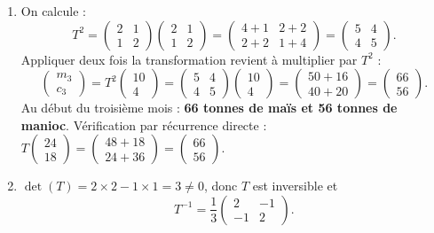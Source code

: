 \documentclass[11pt]{article}
\begin{document}
\begin{corrige}
\begin{enumerate}
\item On calcule :
\[ T^2=\begin{pmatrix} 2 & 1 \\ 1 & 2 \end{pmatrix}\begin{pmatrix} 2 & 1 \\ 1 & 2 \end{pmatrix}=\begin{pmatrix} 4+1 & 2+2 \\ 2+2 & 1+4 \end{pmatrix}=\begin{pmatrix} 5 & 4 \\ 4 & 5 \end{pmatrix}. \]
Appliquer deux fois la transformation revient à multiplier par $T^2$ :
\[ \begin{pmatrix} m_3 \\ c_3 \end{pmatrix}=T^2\begin{pmatrix} 10 \\ 4 \end{pmatrix}=\begin{pmatrix} 5 & 4 \\ 4 & 5 \end{pmatrix}\begin{pmatrix} 10 \\ 4 \end{pmatrix}=\begin{pmatrix} 50+16 \\ 40+20 \end{pmatrix}=\begin{pmatrix} 66 \\ 56 \end{pmatrix}. \]
Au début du troisième mois : \textbf{66 tonnes de maïs et 56 tonnes de manioc}. Vérification par récurrence directe : $T\begin{pmatrix} 24 \\ 18 \end{pmatrix}=\begin{pmatrix} 48+18 \\ 24+36 \end{pmatrix}=\begin{pmatrix} 66 \\ 56 \end{pmatrix}$.

\item $\det(T)=2\times2-1\times1=3\neq0$, donc $T$ est inversible et
\[ T^{-1}=\frac{1}{3}\begin{pmatrix} 2 & -1 \\ -1 & 2 \end{pmatrix}. \]


\end{enumerate}
\end{corrige}
\end{document}
